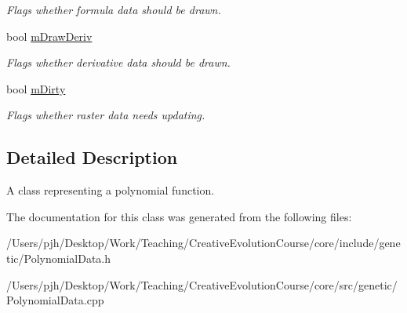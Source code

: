 \begin{DoxyCompactItemize}
\begin{DoxyCompactList}\small\item\em Flags whether formula data should be drawn. \end{DoxyCompactList}\item 
\hypertarget{class_polynomial_data_a665a958ff21bf9969f842eb95818e891}{bool \hyperlink{class_polynomial_data_a665a958ff21bf9969f842eb95818e891}{m\-Draw\-Deriv}}\label{class_polynomial_data_a665a958ff21bf9969f842eb95818e891}

\begin{DoxyCompactList}\small\item\em Flags whether derivative data should be drawn. \end{DoxyCompactList}\item 
\hypertarget{class_polynomial_data_a278f68eb6b129f4635dd5bdbeef62ff6}{bool \hyperlink{class_polynomial_data_a278f68eb6b129f4635dd5bdbeef62ff6}{m\-Dirty}}\label{class_polynomial_data_a278f68eb6b129f4635dd5bdbeef62ff6}

\begin{DoxyCompactList}\small\item\em Flags whether raster data needs updating. \end{DoxyCompactList}\end{DoxyCompactItemize}


\subsection{Detailed Description}
A class representing a polynomial function. 

The documentation for this class was generated from the following files\-:\begin{DoxyCompactItemize}
\item 
/\-Users/pjh/\-Desktop/\-Work/\-Teaching/\-Creative\-Evolution\-Course/core/include/genetic/Polynomial\-Data.\-h\item 
/\-Users/pjh/\-Desktop/\-Work/\-Teaching/\-Creative\-Evolution\-Course/core/src/genetic/Polynomial\-Data.\-cpp\end{DoxyCompactItemize}
